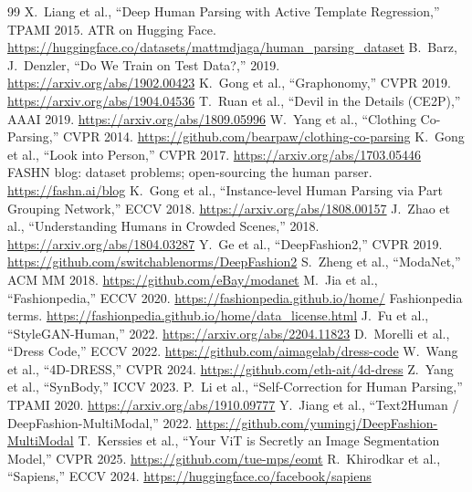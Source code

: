 \documentclass[conference,a4paper]{IEEEtran}
\begin{document}
\balance
\begin{thebibliography}{99}\footnotesize\sloppy
\setlength{\itemsep}{0pt}
 X.~Liang et al., ``Deep Human Parsing with Active Template Regression,'' TPAMI 2015.
 ATR on Hugging Face. \url{https://huggingface.co/datasets/mattmdjaga/human_parsing_dataset}
 B.~Barz, J.~Denzler, ``Do We Train on Test Data?,'' 2019. \url{https://arxiv.org/abs/1902.00423}
 K.~Gong et al., ``Graphonomy,'' CVPR 2019. \url{https://arxiv.org/abs/1904.04536}
 T.~Ruan et al., ``Devil in the Details (CE2P),'' AAAI 2019. \url{https://arxiv.org/abs/1809.05996}
 W.~Yang et al., ``Clothing Co-Parsing,'' CVPR 2014. \url{https://github.com/bearpaw/clothing-co-parsing}
 K.~Gong et al., ``Look into Person,'' CVPR 2017. \url{https://arxiv.org/abs/1703.05446}
 FASHN blog: dataset problems; open-sourcing the human parser. \url{https://fashn.ai/blog}
 K.~Gong et al., ``Instance-level Human Parsing via Part Grouping Network,'' ECCV 2018. \url{https://arxiv.org/abs/1808.00157}
 J.~Zhao et al., ``Understanding Humans in Crowded Scenes,'' 2018. \url{https://arxiv.org/abs/1804.03287}
 Y.~Ge et al., ``DeepFashion2,'' CVPR 2019. \url{https://github.com/switchablenorms/DeepFashion2}
 S.~Zheng et al., ``ModaNet,'' ACM MM 2018. \url{https://github.com/eBay/modanet}
 M.~Jia et al., ``Fashionpedia,'' ECCV 2020. \url{https://fashionpedia.github.io/home/}
 Fashionpedia terms. \url{https://fashionpedia.github.io/home/data_license.html}
 J.~Fu et al., ``StyleGAN-Human,'' 2022. \url{https://arxiv.org/abs/2204.11823}
 D.~Morelli et al., ``Dress Code,'' ECCV 2022. \url{https://github.com/aimagelab/dress-code}
 W.~Wang et al., ``4D-DRESS,'' CVPR 2024. \url{https://github.com/eth-ait/4d-dress}
 Z.~Yang et al., ``SynBody,'' ICCV 2023.
 P.~Li et al., ``Self-Correction for Human Parsing,'' TPAMI 2020. \url{https://arxiv.org/abs/1910.09777}
 Y.~Jiang et al., ``Text2Human / DeepFashion-MultiModal,'' 2022. \url{https://github.com/yumingj/DeepFashion-MultiModal}
 T.~Kerssies et al., ``Your ViT is Secretly an Image Segmentation Model,'' CVPR 2025. \url{https://github.com/tue-mps/eomt}
 R.~Khirodkar et al., ``Sapiens,'' ECCV 2024. \url{https://huggingface.co/facebook/sapiens}

\end{thebibliography}
\end{document}
